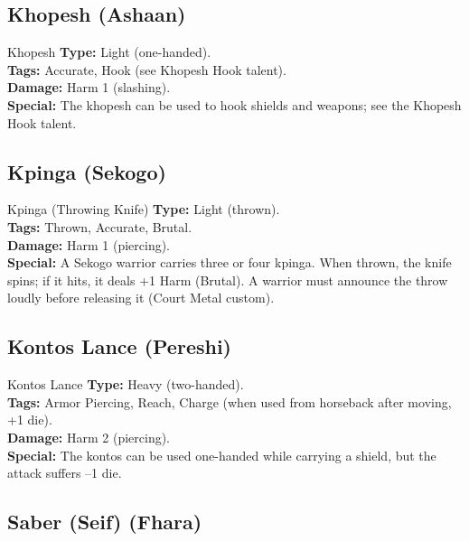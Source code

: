 \documentclass[9pt,a5paper]{extbook}
\begin{document}
\subsection{Khopesh (Ashaan)}

\begin{weaponcard}{Khopesh}
\textbf{Type:} Light (one-handed). \\
\textbf{Tags:} Accurate, Hook (see Khopesh Hook talent). \\
\textbf{Damage:} Harm 1 (slashing). \\
\textbf{Special:} The khopesh can be used to hook shields and weapons; see the Khopesh Hook talent.
\end{weaponcard}

\subsection{Kpinga (Sekogo)}

\begin{weaponcard}{Kpinga (Throwing Knife)}
\textbf{Type:} Light (thrown). \\
\textbf{Tags:} Thrown, Accurate, Brutal. \\
\textbf{Damage:} Harm 1 (piercing). \\
\textbf{Special:} A Sekogo warrior carries three or four kpinga. When thrown, the knife spins; if it hits, it deals +1 Harm (Brutal). A warrior must announce the throw loudly before releasing it (Court Metal custom).
\end{weaponcard}

\subsection{Kontos Lance (Pereshi)}

\begin{weaponcard}{Kontos Lance}
\textbf{Type:} Heavy (two-handed). \\
\textbf{Tags:} Armor Piercing, Reach, Charge (when used from horseback after moving, +1 die). \\
\textbf{Damage:} Harm 2 (piercing). \\
\textbf{Special:} The kontos can be used one-handed while carrying a shield, but the attack suffers --1 die.
\end{weaponcard}

\subsection{Saber (Seif) (Fhara)}
\end{document}
